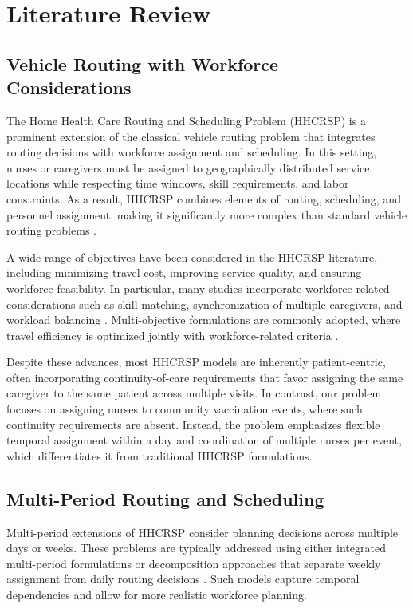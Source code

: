 \section{Literature Review}

\subsection{Vehicle Routing with Workforce Considerations}

The Home Health Care Routing and Scheduling Problem (HHCRSP) is a prominent extension of the classical vehicle routing problem that integrates routing decisions with workforce assignment and scheduling. In this setting, nurses or caregivers must be assigned to geographically distributed service locations while respecting time windows, skill requirements, and labor constraints. As a result, HHCRSP combines elements of routing, scheduling, and personnel assignment, making it significantly more complex than standard vehicle routing problems \cite{fikar2017review,parreno2024phhcrsp}.

A wide range of objectives have been considered in the HHCRSP literature, including minimizing travel cost, improving service quality, and ensuring workforce feasibility. In particular, many studies incorporate workforce-related considerations such as skill matching, synchronization of multiple caregivers, and workload balancing \cite{ma2025hhcrsp,khodabandeh2021biobjective}. Multi-objective formulations are commonly adopted, where travel efficiency is optimized jointly with workforce-related criteria \cite{kordi2023multiobjective}.

Despite these advances, most HHCRSP models are inherently patient-centric, often incorporating continuity-of-care requirements that favor assigning the same caregiver to the same patient across multiple visits. In contrast, our problem focuses on assigning nurses to community vaccination events, where such continuity requirements are absent. Instead, the problem emphasizes flexible temporal assignment within a day and coordination of multiple nurses per event, which differentiates it from traditional HHCRSP formulations.

\subsection{Multi-Period Routing and Scheduling}


Multi-period extensions of HHCRSP consider planning decisions across multiple days or weeks. These problems are typically addressed using either integrated multi-period formulations or decomposition approaches that separate weekly assignment from daily routing decisions \cite{zhao2024weekly}. Such models capture temporal dependencies and allow for more realistic workforce planning.

